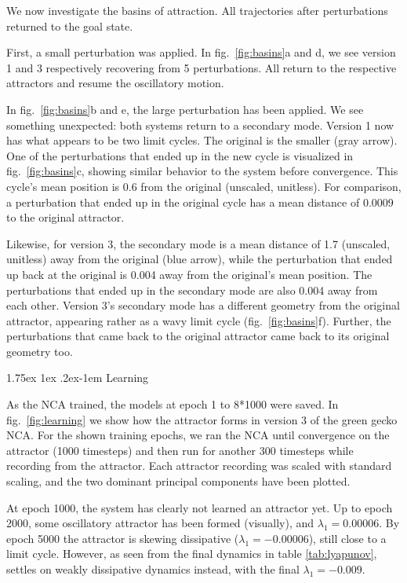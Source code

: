 \documentclass[letterpaper]{article}
\makeatletter
\renewcommand{\paragraph}{%
  \@startsection{paragraph}{4}%
  {\z@}{1.75ex \@plus 1ex \@minus .2ex}{-1em}%
  {\normalfont\normalsize\bfseries}%
}
\makeatother
\begin{document}
We now investigate the basins of attraction. All trajectories after perturbations returned to the goal state. 

First, a small perturbation was applied. In fig.\ \ref{fig:basins}a and d, we see version 1 and 3 respectively recovering from 5 perturbations. All return to the respective attractors and resume the oscillatory motion. 

In fig.\ \ref{fig:basins}b and e, the large perturbation has been applied. We see something unexpected: both systems return to a secondary mode. Version 1 now has what appears to be two limit cycles. The original is the smaller (gray arrow). One of the perturbations that ended up in the new cycle is visualized in fig.\ \ref{fig:basins}c, showing similar behavior to the system before convergence. This cycle's mean position is 0.6 from the original (unscaled, unitless). For comparison, a perturbation that ended up in the original cycle has a mean distance of 0.0009 to the original attractor.

Likewise, for version 3, the secondary mode is a mean distance of 1.7 (unscaled, unitless) away from the original (blue arrow), while the perturbation that ended up back at the original is 0.004 away from the original's mean position. The perturbations that ended up in the secondary mode are also 0.004 away from each other. Version 3's secondary mode has a different geometry from the original attractor, appearing rather as a wavy limit cycle (fig.\ \ref{fig:basins}f). Further, the perturbations that came back to the original attractor came back to its original geometry too.   

\paragraph{Learning}

As the NCA trained, the models at epoch 1 to 8*1000 were saved. In fig.\ \ref{fig:learning} we show how the attractor forms in version 3 of the green gecko NCA. For the shown training epochs, we ran the NCA until convergence on the attractor (1000 timesteps) and then run for another 300 timesteps while recording from the attractor. Each attractor recording was scaled with standard scaling, and the two dominant principal components have been plotted. 

At epoch 1000, the system has clearly not learned an attractor yet. Up to epoch 2000, some oscillatory attractor has been formed (visually), and $\lambda_1=0.00006$. By epoch 5000 the attractor is skewing dissipative ($\lambda_1=-0.00006$), still close to a limit cycle. However, as seen from the final dynamics in table \ref{tab:lyapunov}, settles on weakly dissipative dynamics instead, with the final $\lambda_1=-0.009$.  
\end{document}
